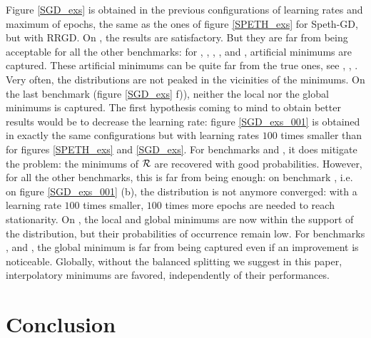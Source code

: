Figure \ref{SGD_exs} is obtained in the previous configurations of learning rates and maximum of epochs, the same as the ones of figure \ref{SPETH_exs} for Speth-GD, but with RRGD. 
On \exTwo, the results are satisfactory. But they are far from being acceptable for all the other benchmarks: for \exOne, \exThree, \exFour, \exFive, \exSeven and \exHeight,
artificial minimums are captured. These artificial minimums can be quite far from the true ones, see \exFour, \exSeven, \exHeight.    
Very often, the distributions are not peaked in the vicinities of the minimums.
On the last benchmark (figure \ref{SGD_exs} f)), neither the local nor the global minimums is captured. 
The first hypothesis coming to mind to obtain better results would be to decrease the learning rate: figure \ref{SGD_exs_001} is obtained in exactly the same configurations but
with learning rates $100$ times smaller than for figures \ref{SPETH_exs} and \ref{SGD_exs}. 
For benchmarks \exOne and \exFour, it does mitigate the problem: the minimums of $\mathcal{R}$ are recovered with good probabilities. 
However, for all the other benchmarks, this is far from being enough: on benchmark \exTwo, i.e. on figure \ref{SGD_exs_001} (b), the distribution is not anymore
converged: with a  learning rate $100$ times smaller, $100$ times more epochs are needed to reach stationarity.
On \exThree, the local and global minimums are now within the support of the distribution, but their probabilities of occurrence remain low.
For benchmarks \exFive, \exSeven and \exHeight, the global minimum is far from being captured even if an improvement is noticeable. 
Globally, without the balanced splitting we suggest in this paper, interpolatory minimums are favored, independently of their performances.  



\section{Conclusion}
\label{section_conclusion}

